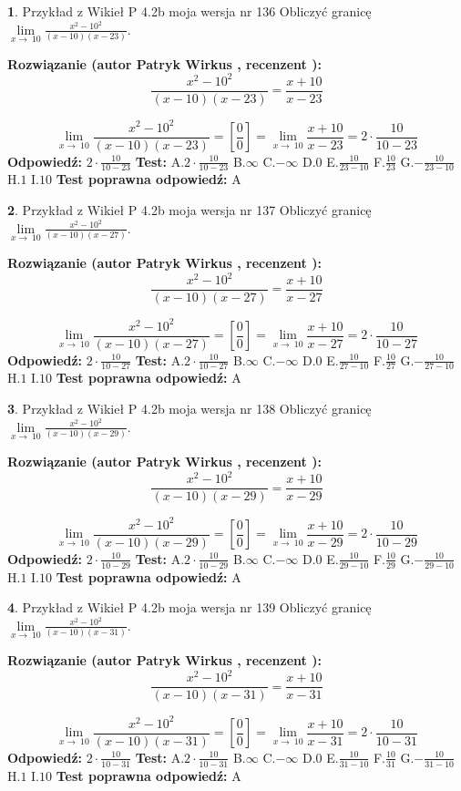 \documentclass[12pt, a4paper]{article}
\theoremstyle{definition} %
\newtheorem{zad}{}
\newcommand{\zadStart}[1]{\begin{zad}#1\newline}
\newcommand{\zadStop}{\end{zad}}
\newcommand{\rozwStart}[2]{\noindent \textbf{Rozwiązanie (autor #1 , recenzent #2): }\newline}
\newcommand{\rozwStop}{\newline}
\newcommand{\odpStart}{\noindent \textbf{Odpowiedź:}\newline}
\newcommand{\odpStop}{\newline}
\newcommand{\testStart}{\noindent \textbf{Test:}\newline}
\newcommand{\testStop}{\newline}
\newcommand{\kluczStart}{\noindent \textbf{Test poprawna odpowiedź:}\newline}
\newcommand{\kluczStop}{\newline}
\begin{document}
\zadStart{Przykład z Wikieł P 4.2b moja wersja nr 136}
Obliczyć granicę $\lim\limits_{x\to\ 10}\frac{x^{2}-10^{2}}{(x-10)(x-23)}$.
\zadStop
\rozwStart{Patryk Wirkus}{}
$$\frac{x^{2}-10^{2}}{(x-10)(x-23)}=\frac{x+10}{x-23}$$

$$\lim\limits_{x\to\ 10}\frac{x^{2}-10^{2}}{(x-10)(x-23)}=[\frac{0}{0}]=\lim\limits_{x\to\ 10}\frac{x+10}{x-23}=2 \cdot \frac{10}{10-23}$$
\rozwStop
\odpStart
$2 \cdot \frac{10}{10-23}$
\odpStop
\testStart
A.$2 \cdot \frac{10}{10-23}$
B.$\infty$
C.$-\infty$
D.$0$
E.$\frac{10}{23-10}$
F.$\frac{10}{23}$
G.$-\frac{10}{23-10}$
H.$1$
I.$10$
\testStop
\kluczStart
A
\kluczStop



\zadStart{Przykład z Wikieł P 4.2b moja wersja nr 137}
Obliczyć granicę $\lim\limits_{x\to\ 10}\frac{x^{2}-10^{2}}{(x-10)(x-27)}$.
\zadStop
\rozwStart{Patryk Wirkus}{}
$$\frac{x^{2}-10^{2}}{(x-10)(x-27)}=\frac{x+10}{x-27}$$

$$\lim\limits_{x\to\ 10}\frac{x^{2}-10^{2}}{(x-10)(x-27)}=[\frac{0}{0}]=\lim\limits_{x\to\ 10}\frac{x+10}{x-27}=2 \cdot \frac{10}{10-27}$$
\rozwStop
\odpStart
$2 \cdot \frac{10}{10-27}$
\odpStop
\testStart
A.$2 \cdot \frac{10}{10-27}$
B.$\infty$
C.$-\infty$
D.$0$
E.$\frac{10}{27-10}$
F.$\frac{10}{27}$
G.$-\frac{10}{27-10}$
H.$1$
I.$10$
\testStop
\kluczStart
A
\kluczStop



\zadStart{Przykład z Wikieł P 4.2b moja wersja nr 138}
Obliczyć granicę $\lim\limits_{x\to\ 10}\frac{x^{2}-10^{2}}{(x-10)(x-29)}$.
\zadStop
\rozwStart{Patryk Wirkus}{}
$$\frac{x^{2}-10^{2}}{(x-10)(x-29)}=\frac{x+10}{x-29}$$

$$\lim\limits_{x\to\ 10}\frac{x^{2}-10^{2}}{(x-10)(x-29)}=[\frac{0}{0}]=\lim\limits_{x\to\ 10}\frac{x+10}{x-29}=2 \cdot \frac{10}{10-29}$$
\rozwStop
\odpStart
$2 \cdot \frac{10}{10-29}$
\odpStop
\testStart
A.$2 \cdot \frac{10}{10-29}$
B.$\infty$
C.$-\infty$
D.$0$
E.$\frac{10}{29-10}$
F.$\frac{10}{29}$
G.$-\frac{10}{29-10}$
H.$1$
I.$10$
\testStop
\kluczStart
A
\kluczStop



\zadStart{Przykład z Wikieł P 4.2b moja wersja nr 139}
Obliczyć granicę $\lim\limits_{x\to\ 10}\frac{x^{2}-10^{2}}{(x-10)(x-31)}$.
\zadStop
\rozwStart{Patryk Wirkus}{}
$$\frac{x^{2}-10^{2}}{(x-10)(x-31)}=\frac{x+10}{x-31}$$

$$\lim\limits_{x\to\ 10}\frac{x^{2}-10^{2}}{(x-10)(x-31)}=[\frac{0}{0}]=\lim\limits_{x\to\ 10}\frac{x+10}{x-31}=2 \cdot \frac{10}{10-31}$$
\rozwStop
\odpStart
$2 \cdot \frac{10}{10-31}$
\odpStop
\testStart
A.$2 \cdot \frac{10}{10-31}$
B.$\infty$
C.$-\infty$
D.$0$
E.$\frac{10}{31-10}$
F.$\frac{10}{31}$
G.$-\frac{10}{31-10}$
H.$1$
I.$10$
\testStop
\kluczStart
A
\kluczStop
\end{document}
